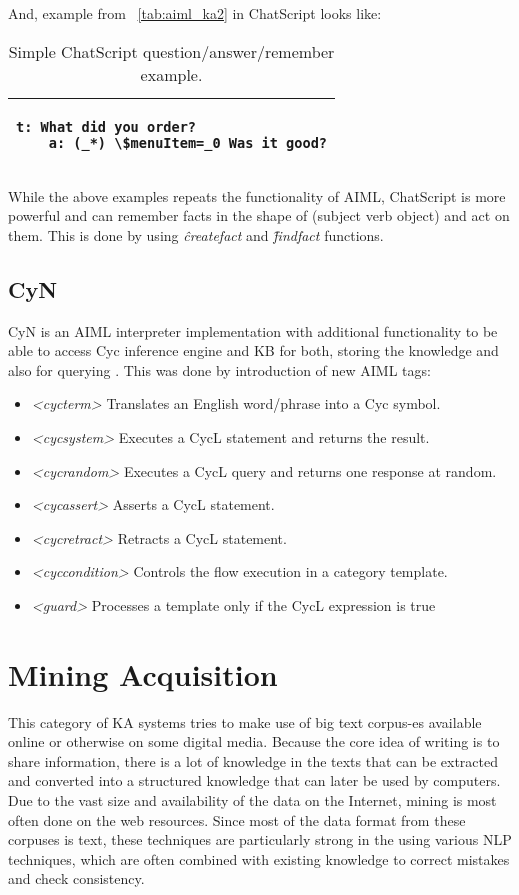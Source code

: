 And, example from \tablename~\ref{tab:aiml_ka2} in ChatScript looks like:

\begin{table}[H]
	\caption{Simple ChatScript question/answer/remember example.}
	\label{tab:chatscript_ka2}
	\centering
	\begin{tabular}{l}
		\hline
		\lstset{breaklines=true}
		\begin{lstlisting}
t: What did you order?
	a: (_*) \$menuItem=_0 Was it good?
		\end{lstlisting}  \\
		\hline
	\end{tabular}
\end{table}

While the above examples repeats the functionality of AIML, ChatScript is more 
powerful and can remember facts in the shape of (subject verb object) and act on
them. This is done by using \emph{\^createfact} and \emph{\^findfact} 
functions.

\subsection {CyN} 
\label{section:r:cyn}
CyN is an AIML interpreter implementation with additional functionality
to be able to access Cyc inference engine and KB for both, storing the knowledge 
and also for querying \parencite{Coursey2004}. This was done by introduction of new 
AIML tags:
\begin{itemize}
	\item \emph{<cycterm>} Translates an English word/phrase into a Cyc symbol.
	\item \emph{<cycsystem>} Executes a CycL statement and returns the result.
	\item \emph{<cycrandom>} Executes a CycL query and returns one response at random.
	\item \emph{<cycassert>} Asserts a CycL statement.
	\item \emph{<cycretract>} Retracts a CycL statement.
	\item \emph{<cyccondition>} Controls the flow execution in a category template.
	\item \emph{<guard>} Processes a template only if the CycL expression is true
\end{itemize} 

\section{Mining Acquisition}
\label{section:r:miningacq}
This category of KA systems tries to make use of big text corpus-es 
available online or otherwise on some digital media. Because the core idea of 
writing is to share information, there is a lot of knowledge in the texts that 
can be extracted and converted into a structured knowledge that can later be used 
by computers. Due to the vast size and availability of the data on the Internet,
mining is most often done on the web resources. Since most of the data format
from these corpuses is text, these techniques are particularly strong in the
using various NLP techniques, which are often combined with existing knowledge
to correct mistakes and check consistency.

